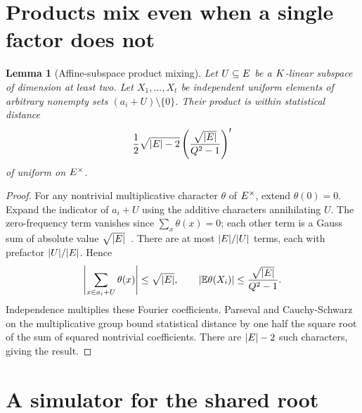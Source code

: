 \documentclass[11pt]{article}
\newtheorem{lemma}[theorem]{Lemma}
\begin{document}
\section{Products mix even when a single factor does not}

\begin{lemma}[Affine-subspace product mixing]\label{lem:bus-mix}
Let $U\subseteq E$ be a $K$-linear subspace of dimension at least two. Let $X_1,\ldots,X_t$ be independent uniform elements of arbitrary nonempty sets $(a_i+U)\setminus\{0\}$. Their product is within statistical distance
\[
 \frac12\sqrt{|E|-2}
 \left(\frac{\sqrt{|E|}}{Q^2-1}\right)^t
\]
of uniform on $E^\times$.
\end{lemma}
\begin{proof}
For any nontrivial multiplicative character $\theta$ of $E^\times$, extend $\theta(0)=0$. Expand the indicator of $a_i+U$ using the additive characters annihilating $U$. The zero-frequency term vanishes since $\sum_x\theta(x)=0$; each other term is a Gauss sum of absolute value $\sqrt{|E|}$~\cite{conrad}. There are at most $|E|/|U|$ terms, each with prefactor $|U|/|E|$. Hence
\[
 \left|\sum_{x\in a_i+U}\theta(x)\right|\le\sqrt{|E|},
 \qquad |\mathbb E\theta(X_i)|\le\frac{\sqrt{|E|}}{Q^2-1}.
\]
Independence multiplies these Fourier coefficients. Parseval and Cauchy-Schwarz on the multiplicative group bound statistical distance by one half the square root of the sum of squared nontrivial coefficients. There are $|E|-2$ such characters, giving the result.
\end{proof}

\section{A simulator for the shared root}
\end{document}

